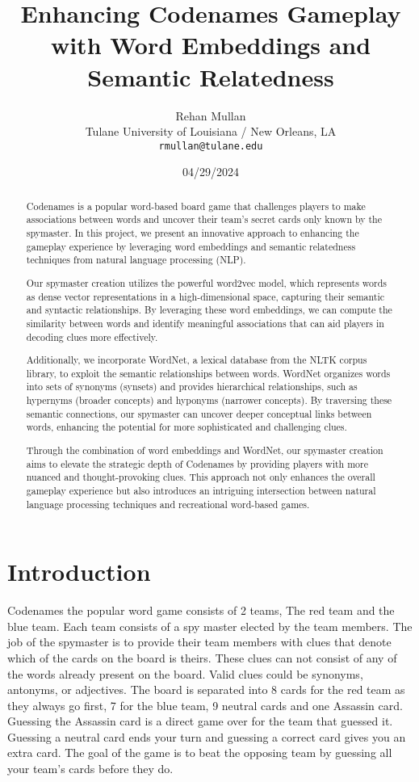 \documentclass[11pt,a4paper]{article}
\title{Enhancing Codenames Gameplay with Word Embeddings and Semantic Relatedness}
\author{Rehan Mullan \\
  Tulane University of Louisiana / New Orleans, LA \\
  \texttt{rmullan@tulane.edu}\\}
\date{04/29/2024}
\begin{document}
\maketitle

\begin{abstract}

Codenames is a popular word-based board game that challenges players to make associations between words and uncover their team's secret cards only known by the spymaster. In this project, we present an innovative approach to enhancing the gameplay experience by leveraging word embeddings and semantic relatedness techniques from natural language processing (NLP).

Our spymaster creation utilizes the powerful word2vec model, which represents words as dense vector representations in a high-dimensional space, capturing their semantic and syntactic relationships. By leveraging these word embeddings, we can compute the similarity between words and identify meaningful associations that can aid players in decoding clues more effectively.
	
Additionally, we incorporate WordNet, a lexical database from the NLTK corpus library, to exploit the semantic relationships between words. WordNet organizes words into sets of synonyms (synsets) and provides hierarchical relationships, such as hypernyms (broader concepts) and hyponyms (narrower concepts). By traversing these semantic connections, our spymaster can uncover deeper conceptual links between words, enhancing the potential for more sophisticated and challenging clues.
	
Through the combination of word embeddings and WordNet, our spymaster creation aims to elevate the strategic depth of Codenames by providing players with more nuanced and thought-provoking clues. This approach not only enhances the overall gameplay experience but also introduces an intriguing intersection between natural language processing techniques and recreational word-based games.

\end{abstract}




\section{Introduction}

Codenames the popular word game consists of 2 teams, The red team and the blue team. Each team consists of a spy master elected by the team members. The job of the spymaster is to provide their team members with clues that denote which of the cards on the board is theirs. These clues can not consist of any of the words already present on the board. Valid clues could be synonyms, antonyms, or adjectives. 
The board is separated into 8 cards for the red team as they always go first, 7 for the blue team, 9 neutral cards and one Assassin card. Guessing the Assassin card is a direct game over for the team that guessed it. Guessing a neutral card ends your turn and guessing a correct card gives you an extra card. The goal of the game is to beat the opposing team by guessing all your team's cards before they do. 
\end{document}
